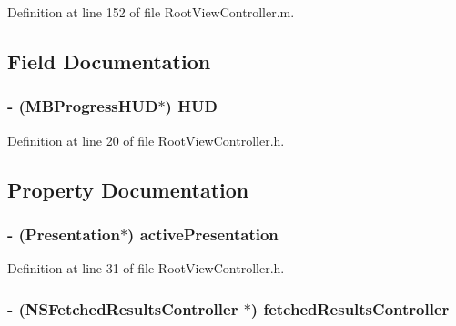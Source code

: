 Definition at line 152 of file RootViewController.m.



\subsection{Field Documentation}
\hypertarget{interface_root_view_controller_a62209f8d829db91e9c588dee85158379}{
\subsubsection[{HUD}]{\setlength{\rightskip}{0pt plus 5cm}-\/ ({\bf MBProgressHUD}$\ast$) {\bf HUD}}}
\label{interface_root_view_controller_a62209f8d829db91e9c588dee85158379}


Definition at line 20 of file RootViewController.h.



\subsection{Property Documentation}
\hypertarget{interface_root_view_controller_ae180d02b7737a300a02c7e8de4426e1d}{
\subsubsection[{activePresentation}]{\setlength{\rightskip}{0pt plus 5cm}-\/ ({\bf Presentation}$\ast$) activePresentation}}
\label{interface_root_view_controller_ae180d02b7737a300a02c7e8de4426e1d}


Definition at line 31 of file RootViewController.h.

\hypertarget{interface_root_view_controller_a7188ae93e075694ba7b03c301e09f8a2}{
\subsubsection[{fetchedResultsController}]{\setlength{\rightskip}{0pt plus 5cm}-\/ (NSFetchedResultsController $\ast$) fetchedResultsController}}
\label{interface_root_view_controller_a7188ae93e075694ba7b03c301e09f8a2}


